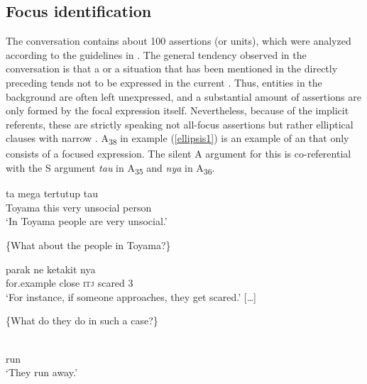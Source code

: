 \documentclass[output=paper
,modfonts
,nonflat]{langsci/langscibook}
\begin{document}
\subsection{Focus identification} 

The conversation contains about 100 assertions (or  units), which were analyzed according to the guidelines in \citet{riear17b}. The general tendency observed in the conversation is that a  or a situation that has been mentioned in the directly preceding  tends not to be expressed in the current . Thus, entities in the background are often left unexpressed, and a substantial amount of assertions are only formed by the focal expression itself. Nevertheless, because of the implicit referents, these are strictly speaking not all-focus assertions but rather elliptical clauses with narrow . A\textsubscript{{38}} in example (\ref{ellipsis1}) is an example of an  that only consists of a focused expression. The silent A argument for this  is co-referential with the S argument \textit{tau} in A\textsubscript{{35}} and \textit{nya} in A\textsubscript{{36}}.

\begin{exe}
	\ex\label{ellipsis1}
	\begin{xlist}[A\textsubscript{{35}}:]
		 {ta} mega tertutup {tau}\\
		Toyama this very unsocial person\\
		\glt `In Toyama people are very unsocial.'
	\end{xlist}
	\begin{xlist}
			\{What about the people in Toyama?\}
	\end{xlist}
	\begin{xlist}[> A\textsubscript{{36'}}:]
		\exi{> A\textsubscript{{36'}}:}
		 {parak{\cb}\nai} ne {{\ob}{\ob}ketakit{\cb}\focus} {{\ob}nya{\cb}\topic{\cb}\sq}\\
		\hphantom{[}for.example close \textsc{itj} \hphantom{[[}scared 3\\
		\glt `For instance, if someone approaches, they get scared.' 
		\exi{} {[\dots]}
	\end{xlist}
	\begin{xlist}
			\{What do they do in such a case?\}
	\end{xlist}
	\begin{xlist}[≫ A\textsubscript{{38}}:]
		\exi{≫ A\textsubscript{{38}}:}
		\gll {{\ob}{\ob}\textbf{barari}{\cb}\focus{\cb}\sq}\\
		\hphantom{[[}run\\
		\glt `They run away.'
	\end{xlist}
\end{exe}
\end{document}
